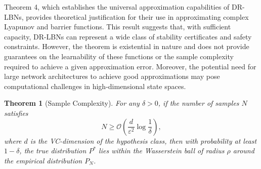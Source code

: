 \documentclass[11pt, oneside]{article}
\newtheorem{theorem}{Theorem}
\begin{document}
 Theorem 4, which establishes the universal approximation capabilities of DR-LBNs, provides theoretical justification for their use in approximating complex Lyapunov and barrier functions. This result suggests that, with sufficient capacity, DR-LBNs can represent a wide class of stability certificates and safety constraints. However, the theorem is existential in nature and does not provide guarantees on the learnability of these functions or the sample complexity required to achieve a given approximation error. Moreover, the potential need for large network architectures to achieve good approximations may pose computational challenges in high-dimensional state spaces.


\setcounter{theorem}{4}
\begin{theorem}[Sample Complexity]
For any $\delta > 0$, if the number of samples $N$ satisfies
\begin{equation}
    N \geq \mathcal{O}\left(\frac{d}{\varepsilon^2}\log\frac{1}{\delta}\right),
\end{equation}
where $d$ is the VC-dimension of the hypothesis class, then with probability at least $1-\delta$, the true distribution $P^*$ lies within the Wasserstein ball of radius $\rho$ around the empirical distribution $P_N$.
\end{theorem}
\end{document}
